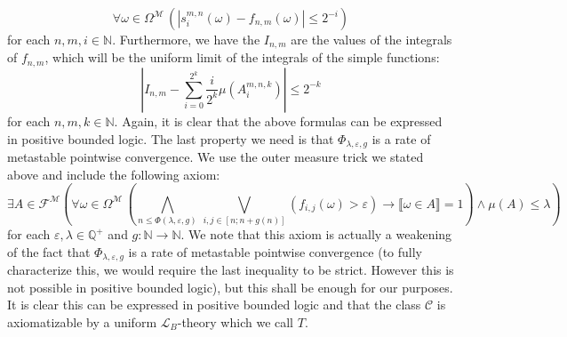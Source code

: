 \documentclass[11pt]{amsart}
\theoremstyle{definition}
\theoremstyle{remark}
\def\NN{\mathbb{N}}
\def\QQ{\mathbb{Q}}
\newcommand{\model}[1]{\llbracket {#1} \rrbracket }
\begin{document}
\[
\forall \omega \in \Omega^\mathcal{M}\,(|s^{m,n}_i(\omega)-f_{n,m}(\omega)| \le 2^{-i})
\]
for each $n,m,i \in \NN$. Furthermore, we have the $I_{n,m}$ are the values of the integrals of $f_{n,m}$, which will be the uniform limit of the integrals of the simple functions:
\[
 \left|I_{n,m}- \sum_{i=0}^{2^k}\frac{i}{2^{k}}\mu(A^{m,n,k}_i)\right| \le 2^{-k}
\]
for each $n,m,k\in \NN$. Again, it is clear that the above formulas can be expressed in positive bounded logic. The last property we need is that $\Phi_{\lambda,\varepsilon,g}$ is a rate of metastable pointwise convergence. We use the outer measure trick we stated above and include the following axiom:
\[
\exists A \in \mathcal{F}^\mathcal{M} \left(\forall \omega\in \Omega^\mathcal{M} \,\left(\bigwedge_ {n\leq \Phi(\lambda,\varepsilon,g)}\, \bigvee_{i,j\in [n;n+g(n)]}(f_{i,j}(\omega)> \varepsilon) \to \model{\omega \in A}=1\right) \land \mu(A) \le \lambda\right)
\]
for each $\varepsilon, \lambda \in \QQ^+$ and $g: \NN \to \NN$. We note that this axiom is actually a weakening of the fact that $\Phi_{\lambda,\varepsilon,g}$ is a rate of metastable pointwise convergence (to fully characterize this, we would require the last inequality to be strict. However this is not possible in positive bounded logic), but this shall be enough for our purposes. It is clear this can be expressed in positive bounded logic and that the class $\mathscr{C}$ is axiomatizable by a uniform $\mathcal{L}_B$-theory which we call $T$.
\end{document}
